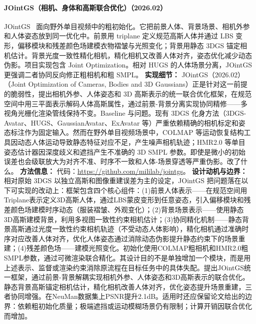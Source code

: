 \paragraph{JOintGS（相机、身体和高斯联合优化）（2026.02）}
JOintGS~\cite{2602_04317} 面向野外单目视频中的粗初始化。它把前景人体、背景场景、相机外参和人体姿态放到同一优化中。前景用 triplane 定义规范高斯人体并通过 LBS 变形，偏移模块和残差颜色场建模衣物褶皱与光照变化；背景用静态 3DGS 锚定相机估计。背景光度一致性精化相机，精化相机又改善人体对齐，姿态优化减少动态伪影。项目实现包含 Joint Optimization。相对 HUGS 的人体场景分离，JOintGS 更强调二者协同反向修正粗相机和粗 SMPL。
\textbf{实现细节：} JOintGS（2026.02） （Joint Optimization of Cameras, Bodies and 3D Gaussians）正是针对这一前提的脆弱性，提出相机外参、人体姿态和 3D 高斯表示的统一联合优化框架，在规范空间中用三平面表示解码人体高斯属性，通过前景-背景分离实现协同精修——多视角光栅化渲染管线保持不变。Baseline 与问题。现有 3DGS 化身方法（3DGS-Avatar、HUGS、GaussianAvatar、ExAvatar 等）严重依赖精确的相机标定和姿态标注作为固定输入。然而在野外单目视频场景中，COLMAP 等运动恢复结构工具因动态人体运动导致静态特征对应不足，产生噪声相机轨迹；HMR2.0 等单目姿态估计器因深度歧义和遮挡产生不准确的 3D SMPL 参数。即使是微小的初始误差也会级联放大为对齐不准、时序不一致和人体-场景穿透等严重伪影。改了什么。
\textbf{方法信息：} 代码：\url{https://github.com/mililab/jointgs}。
\textbf{设计动机与边界：} 相对原始 3DGS 以独立高斯和图像重建误差为主的设定，JOintGS 把问题落在以下可实现的改动上：框架包含四个核心组件：(1)前景人体表示——在规范空间用Triplane表示定义3D高斯人体，通过LBS蒙皮变形到任意姿态，引入偏移模块和残差颜色场建模时序动态（服装褶皱、外观变化）；(2)背景场景表示——使用静态3D高斯建模背景，利用多视图一致性约束相机估计；(3)协同精化机制——静态背景高斯通过光度一致性约束相机轨迹（不受动态人体影响），精化相机通过准确时序对应改善人体对齐，优化人体姿态通过消除动态伪影提升静态约束下的场景重建；(4)残差颜色场——建模光照变化。初始化使用COLMAP粗相机和HMR2.0粗SMPL参数，通过可微渲染联合精化。其设计目的不是单独增加一个模块，而是用上述表示、监督或渲染约束消除原流程在目标任务中的具体失配。提出JOintGS统一框架，通过前景-背景解耦实现相机外参、人体姿态和3D高斯表示的联合优化。静态背景高斯锚定相机估计，精化相机改善人体对齐，优化姿态提升场景重建，三者协同增强。在NeuMan数据集上PSNR提升2.1dB。适用时还应保留论文给出的边界：依赖粗初始化质量；极端遮挡或运动模糊场景仍有限制；计算开销因联合优化而增加。
